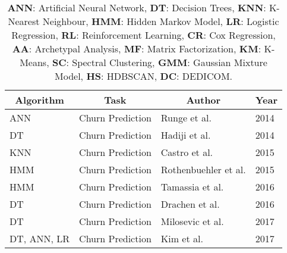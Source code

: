 \begin{table}[h]
\caption[\textbf{Overview of Engagement Modelling Approaches}]{\textbf{ANN}: Artificial Neural Network, \textbf{DT}: Decision Trees, \textbf{KNN}: K-Nearest Neighbour, \textbf{HMM}: Hidden Markov Model, \textbf{LR}: Logistic Regression, \textbf{RL}: Reinforcement Learning, \textbf{CR}: Cox Regression, \textbf{AA}: Archetypal Analysis, \textbf{MF}: Matrix Factorization, \textbf{KM}: K-Means, \textbf{SC}: Spectral Clustering, \textbf{GMM}: Gaussian Mixture Model, \textbf{HS}: HDBSCAN, \textbf{DC}: DEDICOM.}
\label{eng_model_overview}
\centering
\begin{tabularx}{\textwidth}{|l|l|l|X|} 
\hline
\multicolumn{1}{|c|}{\textbf{Algorithm}} & \multicolumn{1}{c|}{\textbf{Task}} & \multicolumn{1}{c|}{\textbf{Author}}                                 & \multicolumn{1}{c|}{\textbf{Year}}  \\ 
\hline
ANN                                      & Churn Prediction                   & Runge et al. \cite{runge2014churn}                  & 2014                                \\ 
\hline
DT                                       & Churn Prediction                   & Hadiji et al. \cite{hadiji2014predicting}           & 2014                                \\ 
\hline
KNN                                      & Churn Prediction                   & Castro et al. \cite{castro2015churn}                & 2015                                \\ 
\hline
HMM                                      & Churn Prediction                   & Rothenbuehler et al. \cite{rothenbuehler2015hidden} & 2015                                \\ 
\hline
HMM                                      & Churn Prediction                   & Tamassia et al. \cite{tamassia2016predicting}       & 2016                                \\ 
\hline
DT                                       & Churn Prediction                   & Drachen et al. \cite{drachen2016rapid}              & 2016                                \\ 
\hline
DT                                       & Churn Prediction                   & Milosevic et al. \cite{milovsevic2017early}         & 2017                                \\ 
\hline
DT, ANN, LR                              & Churn Prediction                   & Kim et al. \cite{kim2017churn}                    & 2017                                \\ 

\end{tabularx}
\end{table}
